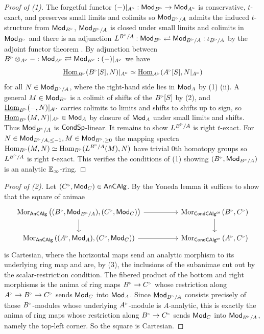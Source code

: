\begin{proof}[Proof of (1)]
    The forgetful functor $(-)|_{A^{\tri}}:\Mod_{B^{\tri}}\to\Mod_{A^{\tri}}$ is conservative, $t$-exact, and preserves small limits and colimits so $\Mod_{B^{\tri}/A}$ admits the induced $t$-structure from $\Mod_{B^{\tri}}$, $\Mod_{B^{\tri}/A}$ is closed under small limits and colimits in $\Mod_{B^{\tri}}$ and there is an adjunction $L^{B^{\tri}/A}:\Mod_{B^{\tri}}\rightleftarrows\Mod_{B^{\tri}/A}:\iota_{B^{\tri}/A}$ by the adjoint functor theorem \cite[Cor. 5.5.2.9]{HTT}. By adjunction between $B^{\tri}\otimes_{A^{\tri}}-:\Mod_{A^{\tri}}\rightleftarrows\Mod_{B^{\tri}}:(-)|_{A^{\tri}}$ we have 
    $$\intHom_{B^{\tri}}(B^{\tri}[S],N)|_{A^{\tri}}\simeq\intHom_{A^{\tri}}(A^{\tri}[S],N|_{A^{\tri}})$$
    for all $N\in\Mod_{B^{\tri}/A}$, where the right-hand side lies in $\mathsf{Mod}_{A}$ by  (1) (ii). A general $M\in\Mod_{B^{\tri}}$ is a colimit of shifts of the $B^{\tri}[S]$ by  (2), and $\intHom_{B^{\tri}}(-,N)|_{A^{\tri}}$ carries colimits to limits and shifts to shifts up to sign, so $\intHom_{B^{\tri}}(M,N)|_{A^{\tri}}\in\Mod_{A}$ by closure of $\mathsf{Mod}_{A}$ under small limits and shifts. Thus $\Mod_{B^{\tri}/A}$ is $\mathsf{Cond}\mathsf{Sp}$-linear. It remains to show $L^{B^{\tri}/A}$ is right $t$-exact. For $N\in\Mod_{B^{\tri}/A,\leq -1},M\in\Mod_{B^{\tri},\geq0}$ the mapping spectra $\Hom_{B^{\tri}}(M, N)\simeq\Hom_{B^{\tri}}(L^{B^{\tri}/A}(M),N)$ have trivial 0th homotopy groups so $L^{B^{\tri}/A}$ is right $t$-exact. This verifies the conditions of  (1) showing $(B^{\tri},\Mod_{B^{\tri}/A})$ is an analytic $\mathbb{E}_{\infty}$-ring. 
\end{proof}
\begin{proof}[Proof of (2)]
    Let $(C^{\tri},\Mod_{C})\in\An\CAlg$. By the Yoneda lemma it suffices to show that the square of animae
    $$
    \begin{tikzcd}
        {\Mor_{\An\CAlg}\left((B^{\tri},\Mod_{B^{\tri}/A}),(C^{\tri},\Mod_{C})\right)} && {\Mor_{\Cond\CAlg^{\cn}}\left(B^{\tri},C^{\tri}\right)} \\
        {\Mor_{\An\CAlg}\left((A^{\tri},\Mod_{A}),(C^{\tri},\Mod_{C})\right)} && {\Mor_{\Cond\CAlg^{\cn}}\left(A^{\tri},C^{\tri}\right)}
        \arrow[from=1-1, to=1-3]
        \arrow[from=1-1, to=2-1]
        \arrow[from=1-3, to=2-3]
        \arrow[from=2-1, to=2-3]
    \end{tikzcd}
    $$
    is Cartesian, where the horizontal maps send an analytic morphism to its underlying ring map and are, by  (3), the inclusions of the subanimae cut out by the scalar-restriction condition. The fibered product of the bottom and right morphisms is the anima of ring maps $B^{\tri}\to C^{\tri}$ whose restriction along $A^{\tri}\to B^{\tri}\to C^{\tri}$ sends $\mathsf{Mod}_{C}$ into $\mathsf{Mod}_{A}$. Since $\Mod_{B^{\tri}/A}$ consists precisely of those $B^{\tri}$-modules whose underlying $A^{\tri}$-module is $A$-analytic, this is exactly the anima of ring maps whose restriction along $B^{\tri}\to C^{\tri}$ sends $\mathsf{Mod}_{C}$ into $\Mod_{B^{\tri}/A}$, namely the top-left corner. So the square is Cartesian. 
\end{proof}
